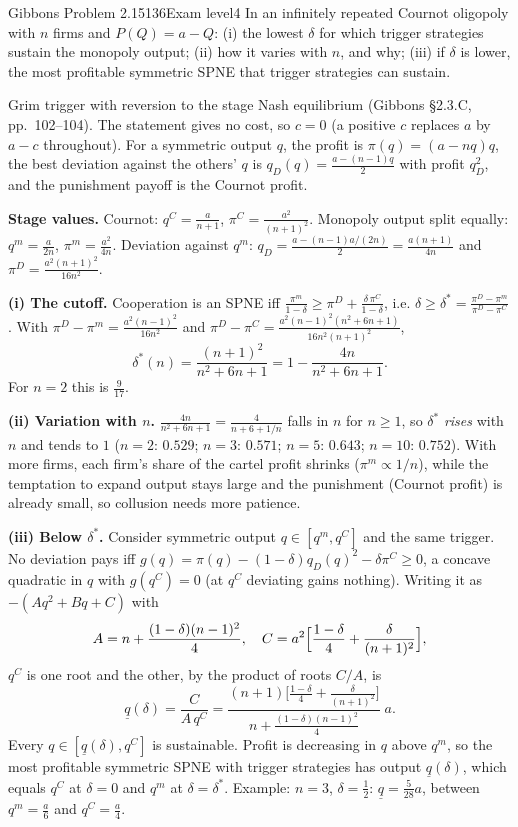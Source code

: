 \begin{exsol}{Gibbons Problem 2.15}{136}{Exam level}{4}
\asked In an infinitely repeated Cournot oligopoly with $n$ firms and $P(Q) = a - Q$: (i) the lowest $\delta$
for which trigger strategies sustain the monopoly output; (ii) how it varies with $n$, and why; (iii) if $\delta$
is lower, the most profitable symmetric SPNE that trigger strategies can sustain.

\method Grim trigger with reversion to the stage Nash equilibrium (Gibbons \S2.3.C, pp.~102--104). The
statement gives no cost, so $c = 0$ (a positive $c$ replaces $a$ by $a - c$ throughout). For a symmetric
output $q$, the profit is $\pi(q) = (a - nq)q$, the best deviation against the others' $q$ is
$q_D(q) = \frac{a - (n-1)q}{2}$ with profit $q_D^2$, and the punishment payoff is the Cournot profit.

\solution
\textbf{Stage values.} Cournot: $q^C = \frac{a}{n+1}$, $\pi^C = \frac{a^2}{(n+1)^2}$. Monopoly output
split equally: $q^m = \frac{a}{2n}$, $\pi^m = \frac{a^2}{4n}$. Deviation against $q^m$: $q_D = \frac{a - (n-1)a/(2n)}{2} =
\frac{a(n+1)}{4n}$ and $\pi^D = \frac{a^2(n+1)^2}{16 n^2}$.

\textbf{(i) The cutoff.} Cooperation is an SPNE iff $\frac{\pi^m}{1-\delta} \ge \pi^D + \frac{\delta\,\pi^C}{1-\delta}$, i.e.
$\delta \ge \delta^* = \frac{\pi^D - \pi^m}{\pi^D - \pi^C}$. With $\pi^D - \pi^m = \frac{a^2(n-1)^2}{16n^2}$ and
$\pi^D - \pi^C = \frac{a^2(n-1)^2(n^2+6n+1)}{16n^2(n+1)^2}$,
\[
  \delta^*(n) = \frac{(n+1)^2}{n^2 + 6n + 1} = 1 - \frac{4n}{n^2 + 6n + 1} .
\]
For $n = 2$ this is $\frac{9}{17}$.

\textbf{(ii) Variation with $n$.} $\frac{4n}{n^2+6n+1} = \frac{4}{n + 6 + 1/n}$ falls in $n$ for $n \ge 1$, so $\delta^*$
\emph{rises} with $n$ and tends to $1$ ($n=2$: $0.529$; $n=3$: $0.571$; $n=5$: $0.643$; $n = 10$: $0.752$). With more
firms, each firm's share of the cartel profit shrinks ($\pi^m \propto 1/n$), while the temptation to expand output
stays large and the punishment (Cournot profit) is already small, so collusion needs more patience.

\textbf{(iii) Below $\delta^*$.} Consider symmetric output $q \in [q^m, q^C]$ and the same trigger. No deviation
pays iff $g(q) = \pi(q) - (1-\delta)q_D(q)^2 - \delta\pi^C \ge 0$, a concave quadratic in $q$ with $g(q^C) = 0$
(at $q^C$ deviating gains nothing). Writing it as $-(Aq^2 + Bq + C)$ with
\[
  A = n + \frac{(1-\delta)(n-1)^2}{4}, \quad C = a^2\Bigl[\frac{1-\delta}{4} + \frac{\delta}{(n+1)^2}\Bigr],
\]
$q^C$ is one root and the other, by the product of roots $C/A$, is
\[
  \underline q(\delta) = \frac{C}{A\,q^C} = \frac{(n+1)\bigl[\frac{1-\delta}{4} + \frac{\delta}{(n+1)^2}\bigr]}
  {n + \frac{(1-\delta)(n-1)^2}{4}}\; a .
\]
Every $q \in [\underline q(\delta), q^C]$ is sustainable. Profit is decreasing in $q$ above $q^m$, so the most
profitable symmetric SPNE with trigger strategies has output $\underline q(\delta)$, which equals $q^C$ at
$\delta = 0$ and $q^m$ at $\delta = \delta^*$. Example: $n = 3$, $\delta = \frac12$: $\underline q = \frac{5}{28}a$,
between $q^m = \frac{a}{6}$ and $q^C = \frac{a}{4}$.


\end{exsol}
